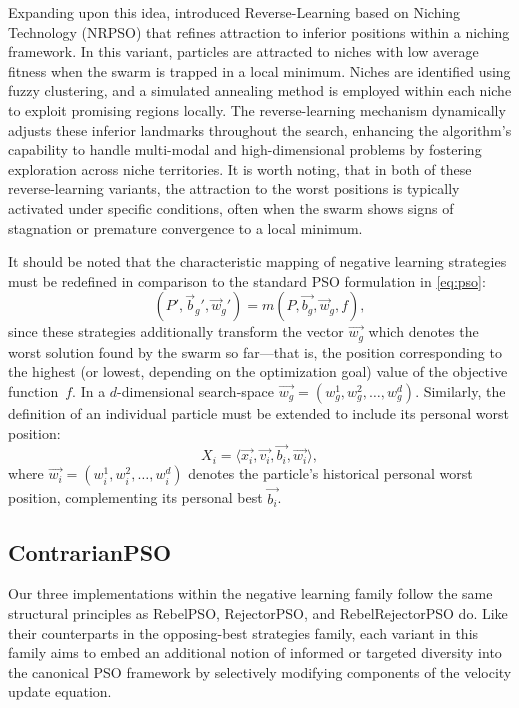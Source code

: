 {Expanding upon this idea, \citet{dong2018reverselearning} introduced Reverse-Learning based on Niching Technology (NRPSO) that refines attraction to inferior positions within a niching framework. In this variant, particles are attracted to niches with low average fitness when the swarm is trapped in a local minimum. Niches are identified using fuzzy clustering, and a simulated annealing method is employed within each niche to exploit promising regions locally. The reverse-learning mechanism dynamically adjusts these inferior landmarks throughout the search, enhancing the algorithm’s capability to handle multi-modal and high-dimensional problems by fostering exploration across niche territories. It is worth noting, that in both of these reverse-learning variants, the attraction to the worst positions is typically activated under specific conditions, often when the swarm shows signs of stagnation or premature convergence to a local minimum. 

\enlargethispage{.1\baselineskip}
It should be noted that the characteristic mapping of negative learning strategies must be redefined in comparison to the standard PSO formulation in \eqref{eq:pso}:
\begin{equation}\label{eq:negative_pso}
(P', \vec{b}_g', \vec{w}_g') = m(P, \vec{b_g}, \vec{w}_g, f),
\end{equation}
since these strategies additionally transform the vector \(\vec{w_g}\) which denotes the worst solution found by the swarm so far—that is, the position corresponding to the highest (or lowest, depending on the optimization goal) value of the objective function~\(f\).
In a \(d\)-dimensional \gls{search-space} \(\vec{w_g} = (w_{g}^{1}, w_{g}^{2}, \dots, w_{g}^{d}) \). Similarly, the definition of an individual particle must be extended to include its personal worst position:
\begin{equation}\label{eq:particle_negative}
X_i = \langle \vec{x_i}, \vec{v_{i}}, \vec{b_i}, \vec{w_i} \rangle,
\end{equation}
where  
\(\vec{w_i} = (w_{i}^{1}, w_{i}^{2}, \dots, w_{i}^{d}) \) denotes the particle’s historical personal worst position, complementing its personal best $\vec{b_i}$.



\subsection{ContrarianPSO}

Our three implementations within the negative learning family follow the same structural principles as RebelPSO, RejectorPSO, and RebelRejectorPSO do. Like their counterparts in the opposing-best strategies family, each variant in this family aims to embed an additional notion of informed or targeted diversity into the canonical PSO framework by selectively modifying components of the velocity update equation.

}
